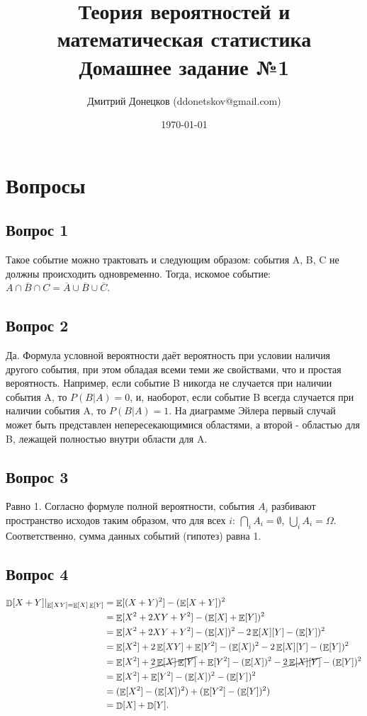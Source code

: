 \documentclass[a4paper,11pt]{article}
\title{Теория вероятностей и математическая статистика \\
Домашнее задание №1}
\author{Дмитрий Донецков (ddonetskov@gmail.com)}
\date{\today}
\DeclareMathOperator*{\E}{\mathbb{E}}   %
\DeclareMathOperator*{\D}{\mathbb{D}}   %
\begin{document}
\maketitle

\section{Вопросы}

\subsection{Вопрос 1}

Такое событие можно трактовать и следующим образом: события A, B, C не должны происходить одновременно. Тогда, искомое событие: $\overline{A \cap B \cap C } = \overline{A} \cup \overline{B} \cup \overline{C}$.

\subsection{Вопрос 2}

Да. Формула условной вероятности даёт вероятность при условии наличия другого события, при этом обладая всеми теми же свойствами, что и простая вероятность. Например, если событие B никогда не случается при наличии события A, то $P(B|A) = 0$, и, наоборот, если событие B всегда случается при наличии события A, то $P(B|A) = 1$. На диаграмме Эйлера первый случай может быть представлен непересекающимися областями, а второй - областью для B, лежащей полностью внутри области для A.

\subsection{Вопрос 3}

Равно 1. Согласно формуле полной вероятности, события $A_i$ разбивают пространство исходов таким образом, что для всех $i$: $\bigcap_{i}{A_i} = \emptyset$, $\bigcup_{i}{A_i} = \Omega$. Соответственно, сумма данных событий (гипотез) равна 1.

\subsection{Вопрос 4}

\begin{equation*}
\begin{split}
\D[X+Y]\rvert_{\E[XY]=\E[X]\E[Y]} & = \E[(X+Y)^2] - (\E[X+Y])^2 \\
& = \E[X^2 + 2XY + Y^2] - (\E[X] + \E[Y])^2 \\
& = \E[X^2 + 2XY + Y^2] - (\E[X])^2 - 2\E[X][Y] - (\E[Y])^2 \\
& = \E[X^2] + 2\E[XY] + \E[Y^2] - (\E[X])^2 - 2\E[X][Y] - (\E[Y])^2 \\
& = \E[X^2] + \cancel{2\E[X]\E[Y]} + \E[Y^2] - (\E[X])^2 - \cancel{2\E[X][Y]} - (\E[Y])^2 \\
& = \E[X^2] + \E[Y^2] - (\E[X])^2 - (\E[Y])^2 \\
& = (\E[X^2] - (\E[X])^2) + (\E[Y^2] - (\E[Y])^2) \\
& = \D[X] + \D[Y].
\end{split}
\end{equation*}
\end{document}
